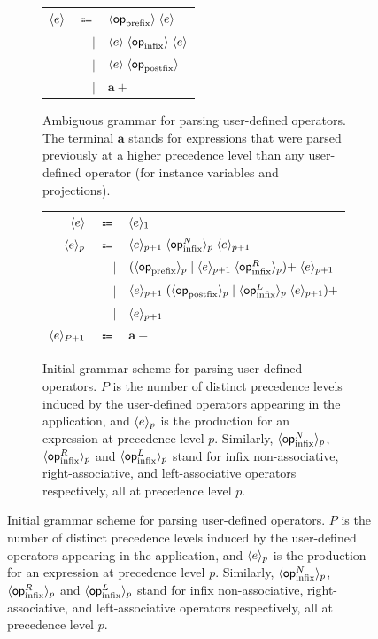 {\newcommand{\prefix}{\mathsf{op}_{\text{prefix}}}
\newcommand{\infix}{\mathsf{op}_{\text{infix}}}
\newcommand{\infixl}{\mathsf{op}_{\text{infix}}^L}
\newcommand{\infixr}{\mathsf{op}_{\text{infix}}^R}
\newcommand{\infixn}{\mathsf{op}_{\text{infix}}^N}
\newcommand{\postfix}{\mathsf{op}_{\text{postfix}}}
\begin{figure}[!htb]
\begin{subfigure}{\linewidth}
\centering
\begin{tabular}{rrl}
$ \langle e\rangle $ & $ \Coloneqq $ & $ \angled{\prefix} \; \angled{e} $\\
& $ \mid $ & $ \angled{e} \; \angled{\infix} \; \angled{e} $\\
& $ \mid $ & $ \angled{e} \; \angled{\postfix} $\\
& $ \mid $ & $ \mathbf{a}+ $
\end{tabular}
\caption{Ambiguous grammar for parsing user-defined operators. The terminal $ \mathbf{a} $ stands for expressions that were parsed previously at a higher precedence level than any user-defined operator (for instance variables and projections).}
\label{figure:user-defined-operators-initial-grammar}
\end{subfigure}
\par\bigskip
\begin{subfigure}{\linewidth}
\centering
\begin{tabular}{rrl}
$ \langle e\rangle $ & $ \Coloneqq $ & $ \langle e\rangle_1 $\\
$ \langle e\rangle_p $ & $ \Coloneqq $ & $ \angled{e}_{p + 1} \; \angled{\infixn}_p \; \angled{e}_{p + 1} $\\
& $ \mid $ & $ (\angled{\prefix}_p \mid \angled{e}_{p + 1} \; \angled{\infixr}_p){+} \; \angled{e}_{p + 1} $\\
& $ \mid $ & $ \angled{e}_{p + 1} \; (\angled{\postfix}_p \mid \angled{\infixl}_p \; \angled{e}_{p + 1}){+} $\\
& $ \mid $ & $ \langle e\rangle_{p + 1} $\\
$ \langle e\rangle_{P + 1} $ & $ \Coloneqq $ & $ \mathbf{a}+ $
\end{tabular}
\caption{%
Initial grammar scheme for parsing user-defined operators.
$ P $ is the number of distinct precedence levels induced by the user-defined operators appearing in the application, and $ \langle e\rangle_p $ is the production for an expression at precedence level $ p $.
Similarly, $ \angled{\infixn}_p $, $ \angled{\infixr}_p $ and $ \angled{\infixl}_p $ stand for infix non-associative, right-associative, and left-associative operators respectively, all at precedence level $ p $.
}
\end{subfigure}
\end{figure}}
